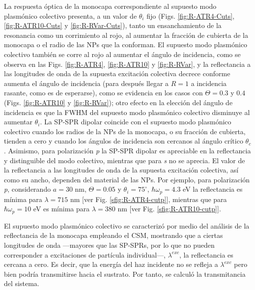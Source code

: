 La respuesta óptica de la monocapa correspondiente al supuesto modo plasmónico colectivo presenta, a un valor de $\theta_i$ fijo (Figs. \ref{fig:R-ATR4-Cuts}, \ref{fig:R-ATR10-Cuts} y \ref{fig:R-RVar-Cuts}), tanto un ensanchamiento de la resonancia como un corrimiento al rojo, al aumentar la fracción de cubierta de la monocapa o el radio de las NPs que la conforman. El supuesto modo plasmónico colectivo también se corre al rojo al aumentar el ángulo de incidencia, como se observa en las Figs. \ref{fig:R-ATR4}, \ref{fig:R-ATR10} y \ref{fig:R-RVar}, y la reflectancia a las longitudes de onda de la supuesta excitación colectiva decrece conforme aumenta el ángulo de incidencia (para después llegar a $R=1$ a incidencia rasante, como es de esperarse), como se evidencia en los casos con $\Theta=0.3$ y $0.4$ (Figs. \ref{fig:R-ATR10} y \ref{fig:R-RVar}); otro efecto en la elección del ángulo de incidencia es que la FWHM del supuesto modo plasmónico colectivo disminuye al aumentar $\theta_i$. La SP-SPR dipolar coincide con el supuesto modo plasmónico colectivo cuando los radios de la NPs de la monocapa, o su fracción de cubierta, tienden a cero y cuando los ángulos de incidencia son cercanos al ángulo crítico $\theta_c$. Asimismo, para polarización \emph{p} la SP-SPR dipolar es apreciable en la reflectancia y distinguible del modo colectivo, mientras que para \emph{s} no se aprecia. El valor de la reflectancia a las longitudes de onda de la supuesta excitación colectiva, así como su ancho, dependen del material de las NPs. Por ejemplo, para polarización \emph{p}, considerando  $a=30$ nm, $\Theta=0.05$ y $\theta_i=75^\circ$, $\hbar\omega_p=4.3$ eV la reflectancia es mínima para $\lambda=715$ nm  [ver Fig. \ref{sfig:R-ATR4-cutp}], mientras que para $\hbar\omega_p=10$ eV es mínima para $\lambda=380$ nm [ver Fig. \ref{sfig:R-ATR10-cutp}].

El supuesto modo plasmónico colectivo se caracterizó por medio del análisis de la reflectancia de la monocapa empleando el CSM, mostrando que a ciertas longitudes de onda ---mayores que las SP-SPRs, por lo que no pueden corresponder a excitaciones de partícula individual---, $\lambda^{exc}$, la reflectancia es cercana a cero. Es decir, que la energía del haz incidente no se refleja a $\lambda^{exc}$ pero bien podría transmitirse hacia el sustrato. Por tanto, se calculó la transmitancia del sistema. 

